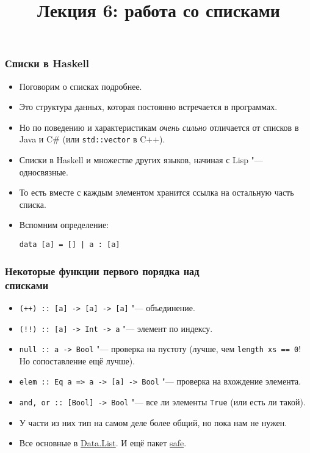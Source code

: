 \documentclass[11pt]{beamer}
\title{Лекция 6: работа со списками}
\begin{document}
\begin{frame}[plain]
  \maketitle
\end{frame}

\begin{frame}[fragile]
  \frametitle{Списки в Haskell}
  \begin{itemize}
    \item Поговорим о списках подробнее.
    \item Это структура данных, которая постоянно встречается в программах.
    \item Но по поведению и характеристикам \emph{очень сильно} отличается от списков в Java и C\# (или \lstinline|std::vector| в C++).
          \pause
    \item Списки в Haskell и множестве других языков, начиная с Lisp "--- односвязные.
          \pause
    \item То есть вместе с каждым элементом хранится ссылка на остальную часть списка.
    \item Вспомним определение:
          \begin{lstlisting}
data [a] = [] | a : [a]
\end{lstlisting}
  \end{itemize}
\end{frame}

\begin{frame}[fragile]
  \frametitle{Некоторые функции первого порядка над\\ списками}
  \begin{itemize}
    \item \lstinline|(++) :: [a] -> [a] -> [a]| \pause"--- объединение.
    \item \lstinline|(!!) :: [a] -> Int -> a| \pause"--- элемент по индексу.
    \item \lstinline|null :: a -> Bool| \pause"--- проверка на пустоту (лучше, чем \lstinline|length xs == 0|! Но сопоставление ещё лучше).
    \item \lstinline|elem :: Eq a => a -> [a] -> Bool| \pause"--- проверка на вхождение элемента.
    \item \lstinline|and, or :: [Bool] -> Bool| \pause"--- все ли элементы \lstinline|True| (или есть ли такой).
          \pause
    \item У части из них тип на самом деле более общий, но пока нам не нужен.
          \pause
    \item Все основные в \href{https://hackage.haskell.org/package/base-4.12.0.0/docs/Data-List.html}{Data.List}. \pause И ещё пакет \href{http://hackage.haskell.org/package/safe}{safe}.
  \end{itemize}
\end{frame}
\end{document}
